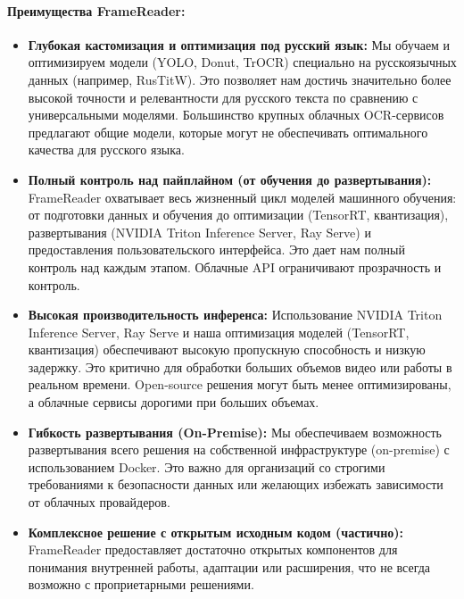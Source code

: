 \documentclass[12pt, a4paper]{article}
\theoremstyle{definition}
\theoremstyle{remark}
\begin{document}
	\paragraph{Преимущества FrameReader:}
	\begin{itemize}
		\item \textbf{Глубокая кастомизация и оптимизация под русский язык:}
		Мы обучаем и оптимизируем модели (YOLO, Donut, TrOCR) специально на русскоязычных данных (например, RusTitW). Это позволяет нам достичь значительно более высокой точности и релевантности для русского текста по сравнению с универсальными моделями. Большинство крупных облачных OCR-сервисов предлагают общие модели, которые могут не обеспечивать оптимального качества для русского языка.
		\item \textbf{Полный контроль над пайплайном (от обучения до развертывания):}
		FrameReader охватывает весь жизненный цикл моделей машинного обучения: от подготовки данных и обучения до оптимизации (TensorRT, квантизация), развертывания (NVIDIA Triton Inference Server, Ray Serve) и предоставления пользовательского интерфейса. Это дает нам полный контроль над каждым этапом. Облачные API ограничивают прозрачность и контроль.
		\item \textbf{Высокая производительность инференса:}
		Использование NVIDIA Triton Inference Server, Ray Serve и наша оптимизация моделей (TensorRT, квантизация) обеспечивают высокую пропускную способность и низкую задержку. Это критично для обработки больших объемов видео или работы в реальном времени. Open-source решения могут быть менее оптимизированы, а облачные сервисы дорогими при больших объемах.
		\item \textbf{Гибкость развертывания (On-Premise):}
		Мы обеспечиваем возможность развертывания всего решения на собственной инфраструктуре (on-premise) с использованием Docker. Это важно для организаций со строгими требованиями к безопасности данных или желающих избежать зависимости от облачных провайдеров.
		\item \textbf{Комплексное решение с открытым исходным кодом (частично):}
		FrameReader предоставляет достаточно открытых компонентов для понимания внутренней работы, адаптации или расширения, что не всегда возможно с проприетарными решениями.
	\end{itemize}
	
\end{document}
